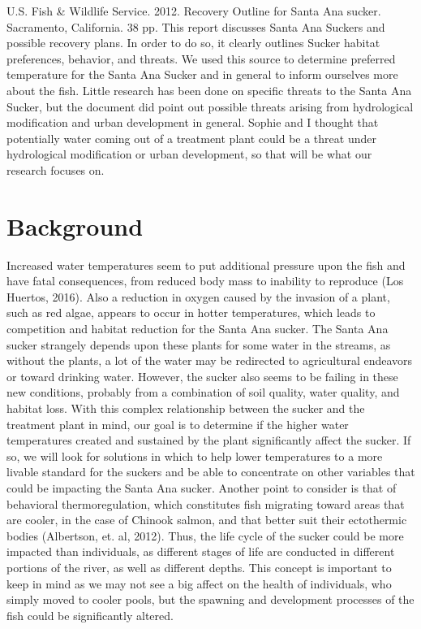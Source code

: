 \documentclass{tufte-handout}
\begin{document}
\begin{description}
U.S. Fish & Wildlife Service. 2012. Recovery Outline for Santa Ana sucker. Sacramento, California. 38 pp.
This report discusses Santa Ana Suckers and possible recovery plans. In order to do so, it clearly outlines Sucker habitat preferences, behavior, and threats. We used this source to determine preferred temperature for the Santa Ana Sucker and in general to inform ourselves more about the fish. Little research has been done on specific threats to the Santa Ana Sucker, but the document did point out possible threats arising from hydrological modification and urban development in general. Sophie and I thought that potentially water coming out of a treatment plant could be a threat under hydrological modification or urban development, so that will be what our research focuses on.

\end{description}
\section{Background} Increased water temperatures seem to put additional pressure upon the fish and have fatal consequences, from reduced body mass to inability to reproduce (Los Huertos, 2016). Also a reduction in oxygen caused by the invasion of a plant, such as red algae, appears to occur in hotter temperatures, which leads to competition and habitat reduction for the Santa Ana sucker. The Santa Ana sucker strangely depends upon these plants for some water in the streams, as without the plants, a lot of the water may be redirected to agricultural endeavors or toward drinking water. However, the sucker also seems to be failing in these new conditions, probably from a combination of soil quality, water quality, and habitat loss. With this complex relationship between the sucker and the treatment plant in mind, our goal is to determine if the higher water temperatures created and sustained by the plant significantly affect the sucker. If so, we will look for solutions in which to help lower temperatures to a more livable standard for the suckers and be able to concentrate on other variables that could be impacting the Santa Ana sucker. Another point to consider is that of behavioral thermoregulation, which constitutes fish migrating toward areas that are cooler, in the case of Chinook salmon, and that better suit their ectothermic bodies (Albertson, et. al, 2012). Thus, the life cycle of the sucker could be more impacted than individuals, as different stages of life are conducted in different portions of the river, as well as different depths. This concept is important to keep in mind as we may not see a big affect on the health of individuals, who simply moved to cooler pools, but the spawning and development processes of the fish could be significantly altered.
\end{document}
